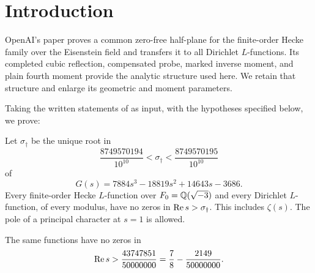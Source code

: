\begin{abstract}
Using the written statements of OpenAI's \emph{The Quasi-Riemann Hypothesis: A Zero-Free Half-Plane $\Rea s>7/8$} (30 September 2026) as input, we refine its compensated-probe argument. Every Dirichlet $L$-function, every finite-order Hecke $L$-function over $\Q(\sqrt{-3})$, and the Riemann zeta function have no zeros in $\Rea s>\sigma_\dagger$, where $\sigma_\dagger=0.8749570194\ldots$ is the root in $(0.8749570194,0.8749570195)$ of $7884s^3-18819s^2+14643s-3686$. In particular, $\Rea s>43747851/50000000$ is zero-free; principal poles at $s=1$ are allowed. Optimising the skew parameter gives the quadratic endpoint $(1507-2\sqrt{921})/1653$. Extending the plain fourth-moment range from $[3/4,1]$ to $[37/50,1]$ gives the cubic endpoint $\sigma_\dagger$. Exact algebraic certificates are included as ancillary files. One mean-value hypothesis, stated in Section~\ref{sec:limits} and not proved here, would give the boundary $328/375$.
\end{abstract}

\section{Introduction}
OpenAI's paper \cite{openai2026q} proves a common zero-free half-plane for the finite-order Hecke family over the Eisenstein field and transfers it to all Dirichlet $L$-functions. Its completed cubic reflection, compensated probe, marked inverse moment, and plain fourth moment provide the analytic structure used here. We retain that structure and enlarge its geometric and moment parameters.

Taking the written statements of \cite{openai2026q} as input, with the hypotheses specified below, we prove:

\begin{theorem}\label{thm:main}
Let $\sigma_\dagger$ be the unique root in
\[
 \frac{8749570194}{10^{10}}<\sigma_\dagger<\frac{8749570195}{10^{10}}
\]
of
\begin{equation}\label{eq:G}
 G(s)=7884s^3-18819s^2+14643s-3686.
\end{equation}
Every finite-order Hecke $L$-function over ${F_0}=\mathbb Q(\sqrt{-3})$ and every Dirichlet $L$-function, of every modulus, have no zeros in $\Rea s>\sigma_\dagger$. This includes $\zeta(s)$. The pole of a principal character at $s=1$ is allowed.
\end{theorem}

\begin{corollary}\label{cor:main}
The same functions have no zeros in
\[
 \operatorname{Re} s>\frac{43747851}{50000000}
 =\frac78-\frac{2149}{50000000}.
\]
\end{corollary}

